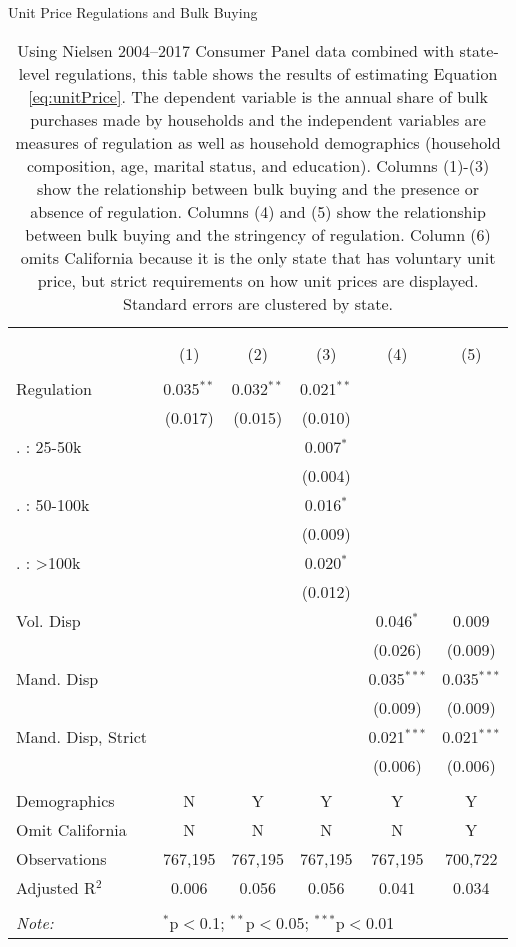 \begin{table}[!htbp] \centering
  \caption{Unit Price Regulations and Bulk Buying}
  \label{tab:unitPriceLaw}
\begin{tabular}{@{\extracolsep{5pt}}lccccc}
\\[-1.8ex]\hline
\hline \\[-1.8ex]
\\[-1.8ex] & (1) & (2) & (3) & (4) & (5)\\
\hline \\[-1.8ex]
 Regulation & 0.035$^{**}$ & 0.032$^{**}$ & 0.021$^{**}$ &  &  \\
  & (0.017) & (0.015) & (0.010) &  &  \\
   . : 25-50k &  &  & 0.007$^{*}$ &  &  \\
  &  &  & (0.004) &  &  \\
   . : 50-100k &  &  & 0.016$^{*}$ &  &  \\
  &  &  & (0.009) &  &  \\
   . : >100k &  &  & 0.020$^{*}$ &  &  \\
  &  &  & (0.012) &  &  \\
  Vol. Disp &  &  &  & 0.046$^{*}$ & 0.009 \\
  &  &  &  & (0.026) & (0.009) \\
  Mand. Disp &  &  &  & 0.035$^{***}$ & 0.035$^{***}$ \\
  &  &  &  & (0.009) & (0.009) \\
  Mand. Disp, Strict &  &  &  & 0.021$^{***}$ & 0.021$^{***}$ \\
  &  &  &  & (0.006) & (0.006) \\
 \hline \\[-1.8ex]
Demographics & N & Y & Y & Y & Y \\
Omit California & N & N & N & N & Y \\
Observations & 767,195 & 767,195 & 767,195 & 767,195 & 700,722 \\
Adjusted R$^{2}$ & 0.006 & 0.056 & 0.056 & 0.041 & 0.034 \\
\hline
\hline \\[-1.8ex]
\textit{Note:}  & \multicolumn{5}{l}{$^{*}$p$<$0.1; $^{**}$p$<$0.05; $^{***}$p$<$0.01} \\
\end{tabular}
\caption*{Using Nielsen 2004--2017 Consumer Panel data combined with state-level regulations, this table shows the results of estimating Equation \ref{eq:unitPrice}. The dependent variable is the annual share of bulk purchases made by households and the independent variables are measures of regulation as well as household demographics (household composition, age, marital status, and education). Columns (1)-(3) show the relationship between bulk buying and the presence or absence of regulation. Columns (4) and (5) show the relationship between bulk buying and the stringency of regulation. Column (6) omits California because it is the only state that has voluntary unit price, but strict requirements on how unit prices are displayed. Standard errors are clustered by state.}
\end{table}
